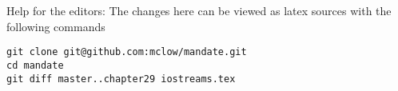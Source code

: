 
\vfill
Help for the editors: The changes here can be viewed as latex sources with the following commands
\begin{verbatim}
git clone git@github.com:mclow/mandate.git
cd mandate
git diff master..chapter29 iostreams.tex
\end{verbatim}
